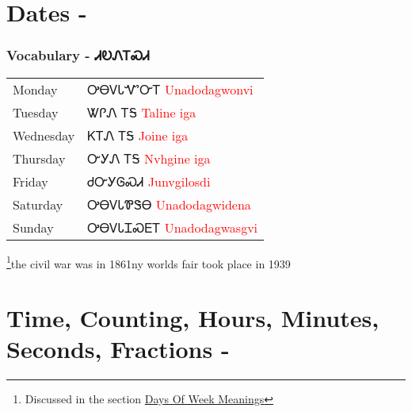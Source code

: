 \begin{multicols}
\chapter{Dates - }
\subsection{Vocabulary - ᏗᎧᏁᎢᏍᏗ 
}
\begin{minipage}{\linewidth}
\begin{tabular}{p{5cm} p{9cm}}
Monday & ᎤᎾᏙᏓᏉᏅᎢ 
 \newline \textcolor{red}{Unadodagwonvi}\\
Tuesday & ᏔᎵᏁ ᎢᎦ 
 \newline \textcolor{red}{Taline iga}\\
Wednesday & ᏦᎢᏁ ᎢᎦ 
 \newline \textcolor{red}{Joine iga}\\
Thursday & ᏅᎩᏁ ᎢᎦ 
 \newline \textcolor{red}{Nvhgine iga}\\
Friday & ᏧᏅᎩᎶᏍᏗ 
 \newline \textcolor{red}{Junvgilosdi}\\
Saturday & ᎤᎾᏙᏓᏈᏕᎾ 
 \newline \textcolor{red}{Unadodagwidena}\\
Sunday & ᎤᎾᏙᏓᏆᏍᎬᎢ 
 \newline \textcolor{red}{Unadodagwasgvi}\\
\end{tabular}
\end{minipage}

\footnote{Discussed in the section \hyperref[sec:daysOfWeekMeaning]{Days Of Week Meanings}}the civil war was in 1861ny worlds fair took place in 1939
\index{}
\chapter{Time, Counting, Hours, Minutes, Seconds, Fractions - }

\end{multicols}
